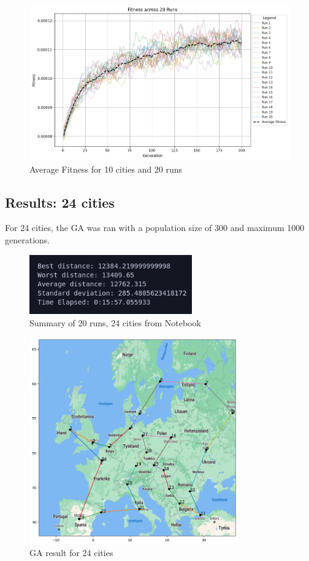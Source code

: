 \documentclass{article}
\begin{document}
    \begin{figure}[ht!]
        \includegraphics[width=12cm]{images/ga_10_cities_avg_graph.png}
        \centering
        \caption{Average Fitness for 10 cities and 20 runs}
    \end{figure}


    \newpage


    \subsection{Results: 24 cities}

    For 24 cities, the GA was ran with a population size of 300 and maximum 1000 generations.

    \begin{figure}[ht!]
        \includegraphics[width=7cm]{images/ga_24_cities_summary.png}
        \centering
        \caption{Summary of 20 runs, 24 cities from Notebook}
    \end{figure}

    \begin{figure}[ht!]
        \includegraphics[width=9cm]{images/ga_24_cities.png}
        \centering
        \caption{GA result for 24 cities}
    \end{figure}
\end{document}
